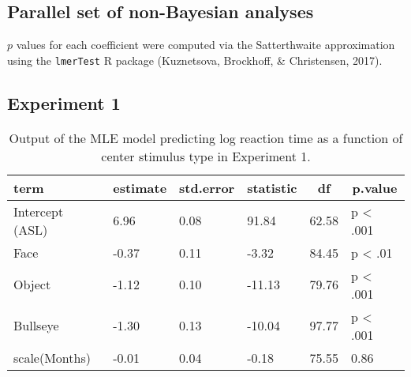 \documentclass[,man,floatsintext]{apa6}
\begin{document}
\begin{appendix}
\hypertarget{parallel-set-of-non-bayesian-analyses}{%
\section{Parallel set of non-Bayesian
analyses}\label{parallel-set-of-non-bayesian-analyses}}

\(p\) values for each coefficient were computed via the Satterthwaite
approximation using the \texttt{lmerTest} R package (Kuznetsova,
Brockhoff, \& Christensen, 2017).

\hypertarget{experiment-1}{%
\subsection{Experiment 1}\label{experiment-1}}

\begin{table}[h]
\begin{center}
\begin{threeparttable}
\caption{\label{tab:mle rt  trio}Output of the MLE model predicting log reaction time as a function of center stimulus type in Experiment 1.}
\begin{tabular}{llllll}
\toprule
term & \multicolumn{1}{c}{estimate} & \multicolumn{1}{c}{std.error} & \multicolumn{1}{c}{statistic} & \multicolumn{1}{c}{df} & \multicolumn{1}{c}{p.value}\\
\midrule
Intercept (ASL) & 6.96 & 0.08 & 91.84 & 62.58 & p < .001\\
Face & -0.37 & 0.11 & -3.32 & 84.45 & p < .01\\
Object & -1.12 & 0.10 & -11.13 & 79.76 & p < .001\\
Bullseye & -1.30 & 0.13 & -10.04 & 97.77 & p < .001\\
scale(Months) & -0.01 & 0.04 & -0.18 & 75.55 & 0.86\\
\bottomrule
\end{tabular}
\end{threeparttable}
\end{center}
\end{table}


\end{appendix}
\end{document}
